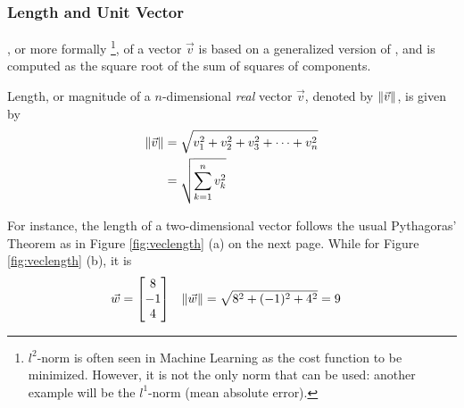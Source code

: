 \subsubsection{Length and Unit Vector} , or more formally \footnote{$l^2$-norm is often seen in Machine Learning as the cost function to be minimized. However, it is not the only norm that can be used: another example will be the $l^1$-norm (mean absolute error).}, of a vector $\vec{v}$ is based on a generalized version of , and is computed as the square root of the sum of squares of components.
\begin{defn}
\label{defn:vectorlength}
Length, or magnitude of a $n$-dimensional \textit{real} vector $\vec{v}$, denoted by $\norm{\vec{v}}$, is given by
\begin{subequations}
\label{eqn:veclength}
\begin{align}
\norm{\vec{v}} &= \sqrt{v_1^2 + v_2^2 + v_3^2 + \cdots + v_n^2} \\
&= \sqrt{\sum_{k=1}^{n} v_k^2}
\end{align}    
\end{subequations}
\end{defn}
For instance, the length of a two-dimensional vector follows the usual Pythagoras' Theorem as in Figure \ref{fig:veclength} (a) on the next page. While for Figure \ref{fig:veclength} (b), it is
\begin{align*}
\vec{w} &= 
\begin{bmatrix}
8 \\
-1 \\
4
\end{bmatrix}
& \norm{\vec{w}}&=
\sqrt{8^2 + (-1)^2 + 4^2} = 9 
\end{align*}
